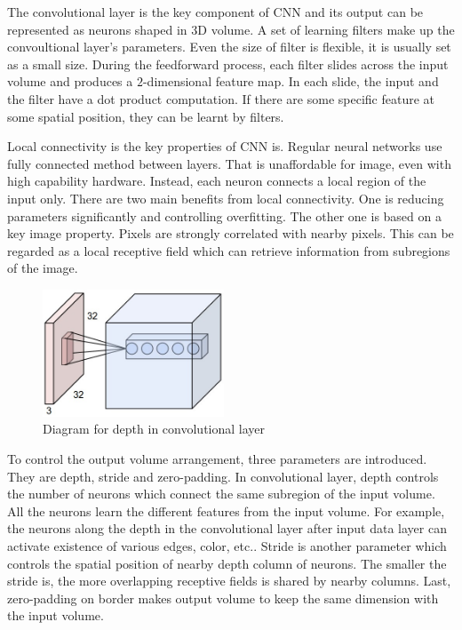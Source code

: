The convolutional layer is the key component of CNN and its output can be represented as neurons shaped in 3D volume. A set of learning filters make up the convoultional layer's parameters. Even the size of filter is flexible, it is usually set as a small size. During the feedforward process, each filter slides across the input volume and produces a $2$-dimensional feature map. In each slide, the input and the filter have a dot product computation. If there are some specific feature at some spatial position, they can be learnt by filters.

Local connectivity is the key properties of CNN is. Regular neural networks use fully connected method between layers. That is unaffordable for image, even with high capability hardware. Instead, each neuron connects a local region of the input only. There are two main benefits from local connectivity. One is reducing parameters significantly and controlling overfitting. The other one is based on a key image property. Pixels are strongly correlated with nearby pixels. This can be regarded as a local receptive field which can retrieve information from subregions of the image.

\graphicspath{ {./Figures/} }
\begin{figure}
  \begin{center}
    \includegraphics[width=0.48\textwidth]{depthcol.jpeg}
  \end{center}
  \caption{Diagram for depth in convolutional layer}
\end{figure}
To control the output volume arrangement, three parameters are introduced. They are depth, stride and zero-padding. In convolutional layer, depth controls the number of neurons which connect the same subregion of the input volume. All the neurons learn the different features from the input volume. For example, the neurons along the depth in the convolutional layer after input data layer can activate existence of various edges, color, etc.. Stride is another parameter which controls the spatial position of nearby depth column of neurons. The smaller the stride is, the more overlapping receptive fields is shared by nearby columns. Last, zero-padding on border makes output volume to keep the same dimension with the input volume.



